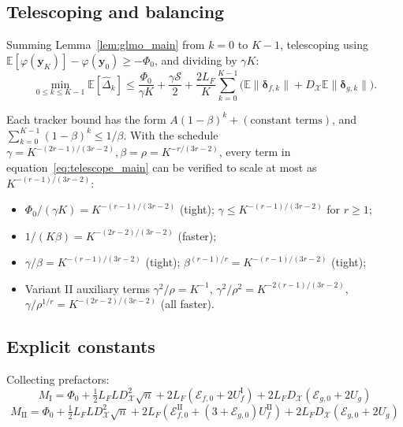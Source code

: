 \documentclass{article}
\def\eqref#1{equation~\ref{#1}}
\newcommand{\cX}{\mathcal{X}}
\def\vy{{\bm{y}}}
\newcommand{\E}{\mathbb{E}}
\begin{document}
\subsection{Telescoping and balancing}

Summing Lemma~\ref{lem:glmo_main} from $k=0$ to $K-1$, telescoping using $\E[\varphi(\vy_K)] - \varphi(\vy_0) \ge -\Phi_0$, and dividing by $\gamma K$:
\begin{equation} \label{eq:telescope_main}
\min_{0 \le k \le K-1} \E[\hat\Delta_k] \le \frac{\Phi_0}{\gamma K} + \frac{\gamma\mathcal{S}}{2} + \frac{2L_F}{K}\sum_{k=0}^{K-1}\big(\E\|\bm\delta_{f,k}\| + D_\cX \E\|\bm\delta_{g,k}\|\big).
\end{equation}

Each tracker bound has the form $A(1-\beta)^k + (\text{constant terms})$, and $\sum_{k=0}^{K-1}(1-\beta)^k \le 1/\beta$. With the schedule $\gamma = K^{-(2r-1)/(3r-2)}, \beta = \rho = K^{-r/(3r-2)}$, every term in \eqref{eq:telescope_main} can be verified to scale at most as $K^{-(r-1)/(3r-2)}$:
\begin{itemize}
\item $\Phi_0/(\gamma K) = K^{-(r-1)/(3r-2)}$ (tight); $\gamma \le K^{-(r-1)/(3r-2)}$ for $r \ge 1$;
\item $1/(K\beta) = K^{-(2r-2)/(3r-2)}$ (faster);
\item $\gamma/\beta = K^{-(r-1)/(3r-2)}$ (tight); $\beta^{(r-1)/r} = K^{-(r-1)/(3r-2)}$ (tight);
\item Variant II auxiliary terms $\gamma^2/\rho = K^{-1}$, $\gamma^2/\rho^2 = K^{-2(r-1)/(3r-2)}$, $\gamma/\rho^{1/r} = K^{-(2r-2)/(3r-2)}$ (all faster).
\end{itemize}

\subsection{Explicit constants}

Collecting prefactors:
\begin{equation} \label{eq:MI_explicit}
\boxed{M_{\mathrm{I}} = \Phi_0 + \tfrac{1}{2} L_F L D_{\cX}^2 \sqrt{n} + 2 L_F (\mathcal{E}_{f,0} + 2 U_f^{\mathrm{I}}) + 2 L_F D_{\cX}(\mathcal{E}_{g,0} + 2 U_g)}
\end{equation}
\begin{equation} \label{eq:MII_explicit}
\boxed{M_{\mathrm{II}} = \Phi_0 + \tfrac{1}{2} L_F L D_{\cX}^2 \sqrt{n} + 2 L_F (\mathcal{E}_{f,0}^{\mathrm{II}} + (3 + \mathcal{E}_{g,0}) U_f^{\mathrm{II}}) + 2 L_F D_{\cX}(\mathcal{E}_{g,0} + 2 U_g)}
\end{equation}
\end{document}

